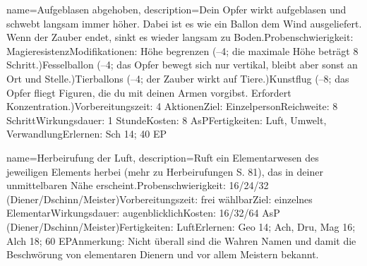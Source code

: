 {
    name={Aufgeblasen abgehoben},
    description={Dein Opfer wirkt aufgeblasen und schwebt langsam immer höher. Dabei ist es wie ein Ballon dem Wind ausgeliefert. Wenn der Zauber endet, sinkt es wieder langsam zu Boden.\newline Probenschwierigkeit: Magieresistenz\newline Modifikationen: Höhe begrenzen (–4; die maximale Höhe beträgt 8 Schritt.)\newline Fesselballon (–4; das Opfer bewegt sich nur vertikal, bleibt aber sonst an Ort und Stelle.)\newline Tierballons (–4; der Zauber wirkt auf Tiere.)\newline Kunstflug (–8; das Opfer fliegt Figuren, die du mit deinen Armen vorgibst. Erfordert Konzentration.)\newline Vorbereitungszeit: 4 Aktionen\newline Ziel: Einzelperson\newline Reichweite: 8 Schritt\newline Wirkungsdauer: 1 Stunde\newline Kosten: 8 AsP\newline Fertigkeiten: Luft, Umwelt, Verwandlung\newline Erlernen: Sch 14; 40 EP}
}


{
    name={Herbeirufung der Luft},
    description={Ruft ein Elementarwesen des jeweiligen Elements herbei (mehr zu Herbeirufungen S. 81), das in deiner unmittelbaren Nähe erscheint.\newline Probenschwierigkeit: 16/24/32 (Diener/Dschinn/Meister)\newline Vorbereitungszeit: frei wählbar\newline Ziel: einzelnes Elementar\newline Wirkungsdauer: augenblicklich\newline Kosten: 16/32/64 AsP (Diener/Dschinn/Meister)\newline Fertigkeiten: Luft\newline Erlernen: Geo 14; Ach, Dru, Mag 16; Alch 18; 60 EP\newline Anmerkung: Nicht überall sind die Wahren Namen und damit die Beschwörung von elementaren Dienern und vor allem Meistern bekannt. }
}


